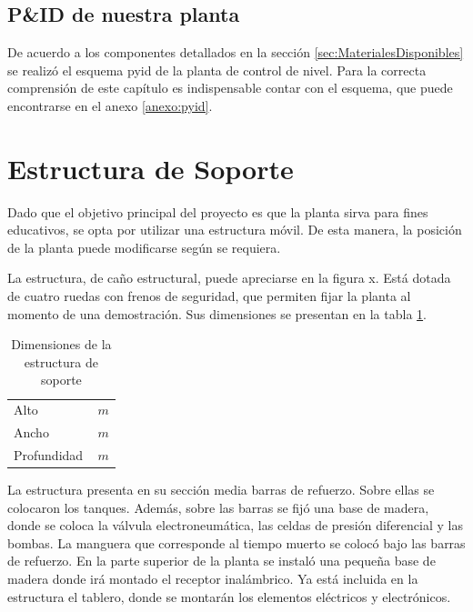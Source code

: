 \subsection{P\&ID de nuestra planta}
De acuerdo a los componentes detallados en la sección
\ref{sec:MaterialesDisponibles} se realizó el esquema \gls{pyid} de la planta
de control de nivel.
Para la correcta comprensión de este capítulo es indispensable contar con el
esquema, que puede encontrarse en el anexo \ref{anexo:pyid}.

\section{Estructura de Soporte}
\label{sec:EstructuraSoporte}

Dado que el objetivo principal del proyecto es que la planta sirva para fines
educativos, se opta por utilizar una estructura móvil.
De esta manera, la posición de la planta puede modificarse según se requiera.

La estructura, de caño estructural, puede apreciarse en la figura x.
Está dotada de cuatro ruedas con frenos de seguridad, que permiten fijar la
planta al momento de una demostración.
Sus dimensiones se presentan en la tabla \ref{tab:dimensionesEstructura}.

\begin{table}
\centering
\begin{tabular}{|l|l|}
\hline
Alto & $\,m$\\
Ancho &  $\,m$\\
Profundidad &  $\,m$\\
\hline
\end{tabular}
\caption{Dimensiones de la estructura de soporte}
\label{tab:dimensionesEstructura}
\end{table}
 
La estructura presenta en su sección media barras de refuerzo.
Sobre ellas se colocaron los tanques.
Además, sobre las barras se fijó una base de madera, donde se coloca la
válvula electroneumática, las celdas de presión diferencial
y las bombas.
La manguera que corresponde al tiempo muerto se colocó bajo
las barras de refuerzo.
En la parte superior de la planta se instaló una pequeña base de
madera donde irá montado el receptor inalámbrico.
Ya está incluida en la estructura el tablero, donde se
montarán los elementos eléctricos y electrónicos.

